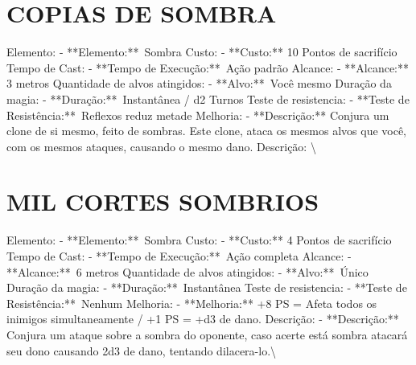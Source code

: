 \documentclass{article}%
\begin{document}
\section{COPIAS DE SOMBRA}%
\label{sec:COPIASDESOMBRA}%
Elemento: {-} **Elemento:**~Sombra\newline%
Custo: {-} **Custo:** 10 Pontos de sacrifício\newline%
Tempo de Cast: {-} **Tempo de Execução:**~Ação padrão\newline%
Alcance: {-} **Alcance:** 3 metros\newline%
Quantidade de alvos atingidos: {-} **Alvo:**~Você mesmo\newline%
Duração da magia: {-} **Duração:**~Instantânea / d2 Turnos\newline%
Teste de resistencia: {-} **Teste de Resistência:**~Reflexos reduz metade\newline%
Melhoria: {-} **Descrição:** Conjura um clone de si mesmo, feito de sombras. Este clone, ataca os mesmos alvos que você, com os mesmos ataques, causando o mesmo dano.\newline%
Descrição: \textbackslash{}

%
\section{MIL CORTES SOMBRIOS}%
\label{sec:MILCORTESSOMBRIOS}%
Elemento: {-} **Elemento:**~Sombra\newline%
Custo: {-} **Custo:** 4 Pontos de sacrifício\newline%
Tempo de Cast: {-} **Tempo de Execução:**~Ação completa\newline%
Alcance: {-} **Alcance:**~6 metros\newline%
Quantidade de alvos atingidos: {-} **Alvo:**~Único\newline%
Duração da magia: {-} **Duração:**~Instantânea\newline%
Teste de resistencia: {-} **Teste de Resistência:**~Nenhum\newline%
Melhoria: {-} **Melhoria:** +8 PS = Afeta todos os inimigos simultaneamente / +1 PS = +d3 de dano.\newline%
Descrição: {-} **Descrição:** Conjura um ataque sobre a sombra do oponente, caso acerte está sombra atacará seu dono causando 2d3 de dano, tentando dilacera{-}lo.\textbackslash{}

%
\end{document}

